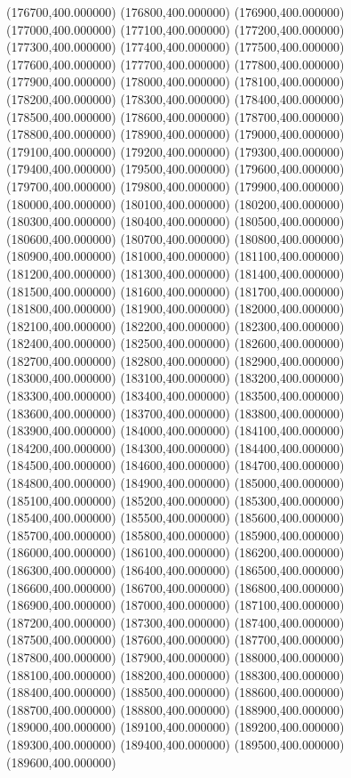 (176700,400.000000)
(176800,400.000000)
(176900,400.000000)
(177000,400.000000)
(177100,400.000000)
(177200,400.000000)
(177300,400.000000)
(177400,400.000000)
(177500,400.000000)
(177600,400.000000)
(177700,400.000000)
(177800,400.000000)
(177900,400.000000)
(178000,400.000000)
(178100,400.000000)
(178200,400.000000)
(178300,400.000000)
(178400,400.000000)
(178500,400.000000)
(178600,400.000000)
(178700,400.000000)
(178800,400.000000)
(178900,400.000000)
(179000,400.000000)
(179100,400.000000)
(179200,400.000000)
(179300,400.000000)
(179400,400.000000)
(179500,400.000000)
(179600,400.000000)
(179700,400.000000)
(179800,400.000000)
(179900,400.000000)
(180000,400.000000)
(180100,400.000000)
(180200,400.000000)
(180300,400.000000)
(180400,400.000000)
(180500,400.000000)
(180600,400.000000)
(180700,400.000000)
(180800,400.000000)
(180900,400.000000)
(181000,400.000000)
(181100,400.000000)
(181200,400.000000)
(181300,400.000000)
(181400,400.000000)
(181500,400.000000)
(181600,400.000000)
(181700,400.000000)
(181800,400.000000)
(181900,400.000000)
(182000,400.000000)
(182100,400.000000)
(182200,400.000000)
(182300,400.000000)
(182400,400.000000)
(182500,400.000000)
(182600,400.000000)
(182700,400.000000)
(182800,400.000000)
(182900,400.000000)
(183000,400.000000)
(183100,400.000000)
(183200,400.000000)
(183300,400.000000)
(183400,400.000000)
(183500,400.000000)
(183600,400.000000)
(183700,400.000000)
(183800,400.000000)
(183900,400.000000)
(184000,400.000000)
(184100,400.000000)
(184200,400.000000)
(184300,400.000000)
(184400,400.000000)
(184500,400.000000)
(184600,400.000000)
(184700,400.000000)
(184800,400.000000)
(184900,400.000000)
(185000,400.000000)
(185100,400.000000)
(185200,400.000000)
(185300,400.000000)
(185400,400.000000)
(185500,400.000000)
(185600,400.000000)
(185700,400.000000)
(185800,400.000000)
(185900,400.000000)
(186000,400.000000)
(186100,400.000000)
(186200,400.000000)
(186300,400.000000)
(186400,400.000000)
(186500,400.000000)
(186600,400.000000)
(186700,400.000000)
(186800,400.000000)
(186900,400.000000)
(187000,400.000000)
(187100,400.000000)
(187200,400.000000)
(187300,400.000000)
(187400,400.000000)
(187500,400.000000)
(187600,400.000000)
(187700,400.000000)
(187800,400.000000)
(187900,400.000000)
(188000,400.000000)
(188100,400.000000)
(188200,400.000000)
(188300,400.000000)
(188400,400.000000)
(188500,400.000000)
(188600,400.000000)
(188700,400.000000)
(188800,400.000000)
(188900,400.000000)
(189000,400.000000)
(189100,400.000000)
(189200,400.000000)
(189300,400.000000)
(189400,400.000000)
(189500,400.000000)
(189600,400.000000)
